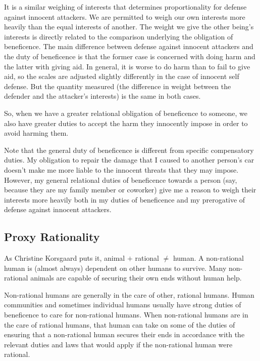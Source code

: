\documentclass[12pt]{book}
\begin{document}
		It is a similar weighing of interests that determines proportionality
		for defense against innocent attackers. We are permitted to weigh our
		own interests more heavily than the equal interests of another. The
		weight we give the other being’s interests is directly related to the
		comparison underlying the obligation of beneficence. The main difference
		between defense against innocent attackers and the duty of beneficence
		is that the former case is concerned with doing harm and the latter
		with giving aid. In general, it is worse to do harm than to fail to
		give aid, so the scales are adjusted slightly differently in the case
		of innocent self defense. But the quantity measured (the difference in
		weight between the defender and the attacker’s interests) is the same
		in both cases.

		So, when we have a greater relational obligation of beneficence to
		someone, we also have greater duties to accept the harm they innocently
		impose in order to avoid harming them.

		Note that the general duty of beneficence is different from specific
		compensatory duties. My obligation to repair the damage that I caused
		to another person’s car doesn’t make me more liable to the innocent
		threats that they may impose. However, my general relational duties
		of beneficence towards a person (say, because they are my family member
		or coworker) give me a reason to weigh their interests more heavily both
		in my duties of beneficence and my prerogative of defense against
		innocent attackers.

    \subsection{Proxy Rationality}
		As Christine Korsgaard puts it, animal $+$ rational $\neq$ human.
		A non-rational human is (almost always) dependent on other humans
		to survive. Many non-rational animals are capable of securing their
		own ends without human help.

		Non-rational humans are generally in the care of other, rational
		humans. Human communities and sometimes individual humans usually
		have strong duties of beneficence to care for non-rational humans.
		When non-rational humans are in the care of rational humans, that
		human can take on some of the duties of ensuring that a non-rational
		human secures their ends in accordance with the relevant duties
		and laws that would apply if the non-rational human were rational.
\end{document}
